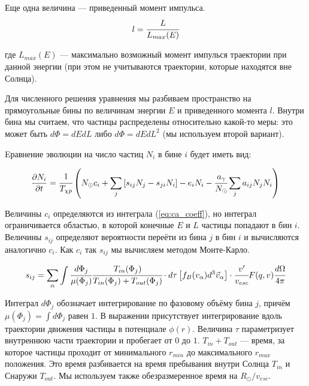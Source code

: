 Еще одна величина --- приведенный момент импульса.
\begin{equation}
	l = \cfrac{L}{L_{max}(E)}
\end{equation}

где $L_{max}(E)$ --- максимально возможный момент импулься траектории при данной энергии (при этом не учитываются траектории, которые находятся вне Солнца).



Для численного решения уравнения мы разбиваем пространство на прямоугольные бины по величинам энергии $E$ и приведенного момента $l$. Внутри бина мы считаем, что частицы распределены относительно какой-то меры: это может быть $d\Phi = dEdL$ либо $d\Phi = dEdL^2$ (мы используем второй вариант). 

Eравнение эволюции на число частиц $N_{i}$ в бине $i$ будет иметь вид:

\begin{equation}
	\label{eq:evolution}
	\frac{\partial N_{i}}{\partial t} = \cfrac{1}{T_{\chi p}} \left(N_{\odot} c_i +
	\sum_j{[s_{ij} N_{j} - s_{ji} N_{i} ]} - e_{i} N_i - \cfrac{a_{\gamma}}{N_{\odot}} \sum_j {a_{ij} N_j N_i} \right)
\end{equation}

Величины $c_i$ определяются из интеграла (\ref{eq:ca_coeff}), но интеграл ограничивается областью, в которой конечные $E$ и $L$ частицы попадают в бин $i$.
Величины $s_{ij}$ определяют вероятности переёти из бина $j$ в бин $i$ и вычисляются аналогично $c_{i}$. Как $c_{i}$ так  $s_{ij}$ мы вычисляем методом Монте-Карло.

\begin{equation}
	\label{eq:st_integral}
	s_{ij} = \sum_{\alpha}\int{
		\cfrac{d\Phi_{j}}{\mu(\Phi_{j})}
		\cfrac{T_{in}(\Phi_{j})}{
			T_{in}(\Phi_{j})+T_{out}(\Phi_{j})
		} \cdot d\tau \left[ f_B(v_{\alpha}) d^3 \vec{v}_{\alpha} \right] \cdot \cfrac{v'}{v_{esc}} F(q,v) \cfrac{d\Omega}{4\pi}
	}
\end{equation}

\noindent Интеграл $d\Phi_{j}$ обозначает интегрирование по фазовому объёму бина $j$, причём $\mu(\Phi_{j}) = \int{d\Phi_{j}}$ равен $1$. В выражении присутствует интегрирование вдоль траектории движения частицы в потенциале $\phi(r)$. Величина $\tau$ параметризует внутреннюю части траектории и пробегает от $0$ до $1$. $T_{in} + T_{out}$ --- время, за которое частицы проходит от минимального $r_{min}$ до максимального $r_{max}$ положения. Это время разбивается на время пребывания внутри Солнца $T_{in}$ и Снаружи $T_{out}$. Мы используем также обезразмеренное время на $R_{\odot}/v_{esc}$.

